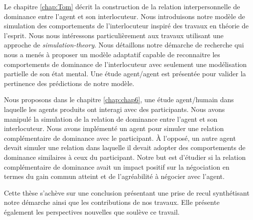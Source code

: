 Le chapitre \ref{chap:Tom} décrit la construction de la relation interpersonnelle de dominance entre l'agent et son interlocuteur. 
Nous introduisons notre modèle de simulation des comportements de l'interlocuteur inspiré des travaux en théorie de l'esprit. Nous nous intéressons particulièrement aux travaux utilisant une approche de \emph{simulation-theory}.
Nous détaillons notre démarche de recherche qui nous a menés à proposer un modèle adaptatif capable de reconnaitre les comportements de dominance de l'interlocuteur avec seulement une modélisation partielle de son état mental.
Une étude agent/agent est présentée pour valider la pertinence des prédictions de notre modèle. 

Nous proposons dans le chapitre \ref{chap:chap6}, une étude agent/humain dans laquelle les agents produits ont interagi avec des participants. Nous avons manipulé la simulation de la relation de dominance entre l'agent et son interlocuteur. Nous avons implémenté un agent pour simuler une relation complémentaire de dominance avec le participant. À l'opposé, un autre agent devait simuler une relation dans laquelle il devait adopter des comportements de dominance similaires à ceux du participant. Notre but est d'étudier si la relation complémentaire de dominance avait un impact positif sur la négociation en termes du gain commun atteint et de l'agréabilité à négocier avec l'agent. 

Cette thèse s'achève sur une conclusion présentant une prise de recul synthétisant notre démarche ainsi que les contributions de nos travaux. Elle présente également les perspectives nouvelles que soulève ce travail.